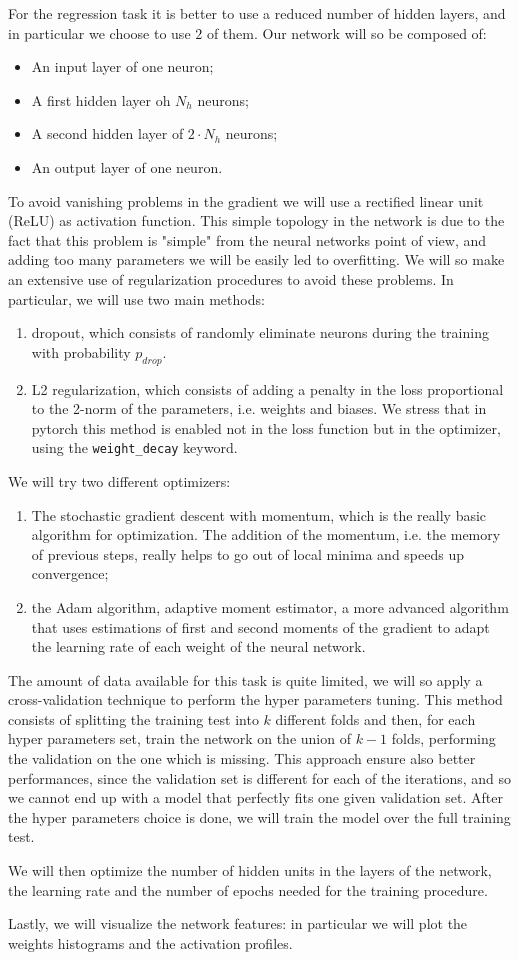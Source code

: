 For the regression task it is better to use a reduced number of hidden layers, and in particular we choose to use $2$ of them.
Our network will so be composed of:
\begin{itemize}
    \item An input layer of one neuron;
    \item A first hidden layer oh $N_h$ neurons;
    \item A second hidden layer of $2\cdot N_h$ neurons;
    \item An output layer of one neuron.
\end{itemize}
To avoid vanishing problems in the gradient we will use a rectified linear unit (ReLU) as activation function.
This simple topology in the network is due to the fact that this problem is "simple" from the neural networks point of view, and adding too many parameters we 
will be easily led to overfitting. We will so make an extensive use of regularization procedures to avoid these problems. In 
particular, we will use two main methods:
\begin{enumerate}
    \item dropout, which consists of randomly eliminate neurons during the training with probability $p_{drop}$.    
    \item L2 regularization, which consists of adding a penalty in the loss proportional to the 2-norm
        of the parameters, i.e. weights and biases. We stress that in pytorch this method is enabled not in the loss
        function but in the optimizer, using the \lstinline{weight_decay} keyword.
\end{enumerate}
We will try two different optimizers:
\begin{enumerate}
    \item The stochastic gradient descent with momentum, which is the really basic algorithm for optimization.
        The addition of the momentum, i.e. the memory of previous steps, really helps to go out of local minima and speeds up convergence;
    \item the Adam algorithm, adaptive moment estimator, a more advanced algorithm that uses estimations of first and second 
        moments  of the gradient to adapt the learning rate of each weight of the neural network.
\end{enumerate}
The amount of data available for this task is quite limited, we will so apply a cross-validation technique to perform the 
hyper parameters tuning. This method consists of splitting the training test into $k$ different folds and then, for each
hyper parameters set, train the network on the union of $k-1$ folds, performing the validation on the one which is missing.
This approach ensure also better performances, since the validation set is different for each of the iterations, and so we
cannot end up with a model that perfectly fits one given validation set.
After the hyper parameters choice is done, we will train the model over the full training test.

We will then optimize the number of hidden units in the layers of the network, the learning rate and the number of epochs
needed for the training procedure.

Lastly, we will visualize the network features: in particular we will plot the weights histograms and the activation profiles.